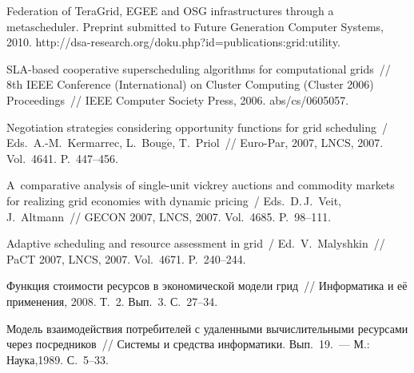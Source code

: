 \begin{multicols}{2}
{{\begin{thebibliography}{99}
  Federation of TeraGrid, EGEE and OSG infrastructures through a metascheduler. Preprint 
submitted to Future Generation Computer Systems, 2010. 
  {\sf http://dsa-research.org/doku.php?id=publications:grid:utility}.
  
  SLA-based cooperative superscheduling algorithms for computational grids~// 8th IEEE  
Conference (International) on Cluster Computing (Cluster 2006) Proceedings~// IEEE Computer 
Society Press, 2006. abs/cs/0605057.
  
  Negotiation strategies considering opportunity functions for grid scheduling~/ Eds.\ 
  A.-M.~Kermarrec, L.~Boug$\acute{\mbox{e}}$, T.~Priol~// Euro-Par, 2007, LNCS, 2007. 
Vol.~4641. P.~447--456.
  
  A~comparative analysis of single-unit vickrey auctions and commodity markets for realizing 
grid economies with dynamic pricing~/ Eds.\ D.\,J.~Veit, J.~Altmann~// GECON 2007, LNCS, 
2007. Vol.~4685. P.~98--111.
  
  Adaptive scheduling and resource assessment in grid~/ Ed.\ V.~Malyshkin~// PaCT 2007, LNCS, 
2007. Vol.~4671. P.~240--244.
  
  Функция стоимости ресурсов в экономической модели грид~// Информатика и её 
применения, 2008. Т.~2. Вып.~3. С.~27--34.

\label{end\stat}
  
  Модель взаимодействия потребителей с удаленными вычислительными ресурсами через 
посредников~// Системы и средства информатики. Вып.~19.~--- М.: Наука,1989. С.~5--33.
 \end{thebibliography}
}
}

\end{multicols}
 
 
 
 